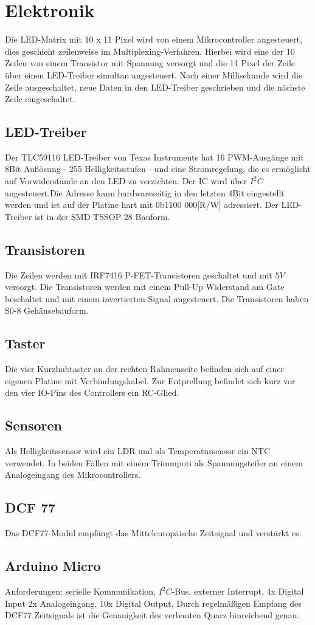 
\section{Elektronik}
\label{sec:Elektronik}
Die LED-Matrix mit 10 x 11 Pixel wird von einem Mikrocontroller angesteuert, dies geschieht zeilenweise im Multiplexing-Verfahren. Hierbei wird eine der 10  Zeilen von einem Transistor mit Spannung versorgt und die 11 Pixel der Zeile über einen LED-Treiber simultan angesteuert. Nach einer Millisekunde wird die Zeile ausgeschaltet, neue Daten in den LED-Treiber geschrieben und die nächste Zeile eingeschaltet. 
\subsection{LED-Treiber}
Der TLC59116 LED-Treiber von Texas Instruments hat 16 PWM-Ausgänge mit 8Bit Auflösung - 255 Helligkeitsstufen - und eine Stromregelung, die es ermöglicht auf Vorwiderstände an den LED zu verzichten. Der IC wird über $I^{2}C$ angesteuert.Die Adresse kann hardwareseitig in den letzten 4Bit eingestellt werden und ist auf der Platine hart mit 0b1100 000[R/W] adressiert. Der LED-Treiber ist in der SMD TSSOP-28 Bauform.
\subsection{Transistoren}
Die Zeilen werden mit IRF7416 P-FET-Transistoren geschaltet und mit $5V$ versorgt. Die Transistoren werden mit einem Pull-Up Widerstand am Gate beschaltet und mit einem invertierten Signal angesteuert. Die Transistoren haben S0-8 Gehäusebauform. 
\subsection{Taster}
Die vier Kurzhubtaster an der rechten Rahmenseite befinden sich auf einer eigenen Platine mit Verbindungskabel. Zur Entprellung befindet sich kurz vor den vier IO-Pins des Controllers ein RC-Glied. 
\subsection{Sensoren}
Als Helligkeitssensor wird ein LDR und als Temperatursensor ein NTC verwendet. In beiden Fällen mit einem Trimmpoti als Spannungsteiler an einem Analogeingang des Mikrocontrollers.
\subsection{DCF 77}
Das DCF77-Modul empfängt das Mitteleuropäische Zeitsignal und verstärkt es. 
\subsection{Arduino Micro}
Anforderungen: serielle Kommunikation, $I^{2}C$-Bus, externer Interrupt, 4x Digital Input 2x Analogeingang, 10x Digital Output, 
Durch regelmäßigen Empfang des DCF77 Zeitsignals ist die Genauigkeit des verbauten Quarz hinreichend genau.
